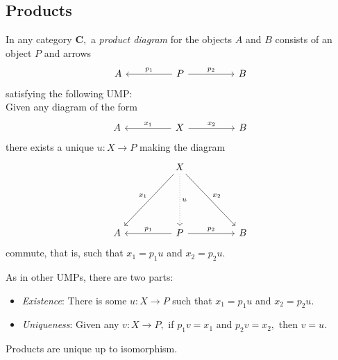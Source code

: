 \subsection{Products}
\begin{defn} \label{def:prod}
	In any category $\mathbf{C},$ a \emph{product diagram} for the objects $A$ and $B$ consists of an object $P$ and arrows
	\begin{equation*} 
		\begin{tikzcd}
			A && P \arrow[ll, "p_1"'] \arrow[rr, "p_2"] && B
		\end{tikzcd}
	\end{equation*}
	satisfying the following UMP:\\
	Given any diagram of the form
	\begin{equation*} 
		\begin{tikzcd}
			A && X \arrow[ll, "x_1"'] \arrow[rr, "x_2"] && B
		\end{tikzcd}
	\end{equation*}
	there exists a unique $u:X\to P$ making the diagram
	\begin{equation*} 
		\begin{tikzcd}
			&& X \arrow[llddd, "x_1"'] \arrow[rrddd, "x_2"] \arrow[ddd, dotted, "u"] &&\\
			&&&&\\&&&&\\
			A && P \arrow[ll, "p_1"'] \arrow[rr, "p_2"] && B
		\end{tikzcd}
	\end{equation*}
	commute, that is, such that $x_1 = p_1u$ and $x_2 = p_2u.$
\end{defn}
\remark{\label{rem:UMP-prod}} As in other UMPs, there are two parts:
\begin{itemize}
	\item \emph{Existence}: There is some $u:X\to P$ such that $x_1 = p_1u$ and $x_2 = p_2u.$
	\item \emph{Uniqueness}: Given any $v:X\to P,$ if $p_1v = x_1$ and $p_2v = x_2,$ then $v = u.$ 
\end{itemize}
\begin{prop} \label{prop:prodiso}
	Products are unique up to isomorphism.
\end{prop}
